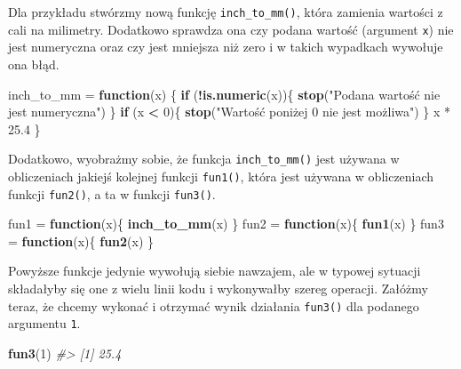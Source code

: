 \documentclass[paper=6in:9in,pagesize=pdftex,headinclude=on,footinclude=on,10pt]{scrbook}
\newenvironment{Shaded}{\begin{snugshade}}{\end{snugshade}}
\newcommand{\CommentTok}[1]{\textcolor[rgb]{0.56,0.35,0.01}{\textit{#1}}}
\newcommand{\ControlFlowTok}[1]{\textcolor[rgb]{0.13,0.29,0.53}{\textbf{#1}}}
\newcommand{\DecValTok}[1]{\textcolor[rgb]{0.00,0.00,0.81}{#1}}
\newcommand{\KeywordTok}[1]{\textcolor[rgb]{0.13,0.29,0.53}{\textbf{#1}}}
\newcommand{\NormalTok}[1]{#1}
\newcommand{\OperatorTok}[1]{\textcolor[rgb]{0.81,0.36,0.00}{\textbf{#1}}}
\newcommand{\StringTok}[1]{\textcolor[rgb]{0.31,0.60,0.02}{#1}}
\begin{document}
Dla przykładu stwórzmy nową funkcję \texttt{inch\_to\_mm()}, która zamienia wartości z cali na milimetry.
Dodatkowo sprawdza ona czy podana wartość (argument \texttt{x}) nie jest numeryczna oraz czy jest mniejsza niż zero i w takich wypadkach wywołuje ona błąd.

\begin{Shaded}
\begin{Highlighting}[]
\NormalTok{inch_to_mm =}\StringTok{ }\ControlFlowTok{function}\NormalTok{(x) \{}
  \ControlFlowTok{if}\NormalTok{ (}\OperatorTok{!}\KeywordTok{is.numeric}\NormalTok{(x))\{}
    \KeywordTok{stop}\NormalTok{(}\StringTok{"Podana wartość nie jest numeryczna"}\NormalTok{)}
\NormalTok{  \}}
  \ControlFlowTok{if}\NormalTok{ (x }\OperatorTok{<}\StringTok{ }\DecValTok{0}\NormalTok{)\{}
    \KeywordTok{stop}\NormalTok{(}\StringTok{"Wartość poniżej 0 nie jest możliwa")}
\StringTok{  \}}
\StringTok{  x * 25.4}
\StringTok{\}}
\end{Highlighting}
\end{Shaded}

Dodatkowo, wyobrażmy sobie, że funkcja \texttt{inch\_to\_mm()} jest używana w obliczeniach jakiejś kolejnej funkcji \texttt{fun1()}, która jest używana w obliczeniach funkcji \texttt{fun2()}, a ta w funkcji \texttt{fun3()}.

\begin{Shaded}
\begin{Highlighting}[]
\NormalTok{fun1 =}\StringTok{ }\ControlFlowTok{function}\NormalTok{(x)\{}
  \KeywordTok{inch_to_mm}\NormalTok{(x)}
\NormalTok{\}}
\NormalTok{fun2 =}\StringTok{ }\ControlFlowTok{function}\NormalTok{(x)\{}
  \KeywordTok{fun1}\NormalTok{(x)}
\NormalTok{\}}
\NormalTok{fun3 =}\StringTok{ }\ControlFlowTok{function}\NormalTok{(x)\{}
  \KeywordTok{fun2}\NormalTok{(x)}
\NormalTok{\}}
\end{Highlighting}
\end{Shaded}

Powyższe funkcje jedynie wywołują siebie nawzajem, ale w typowej sytuacji składałyby się one z wielu linii kodu i wykonywałby szereg operacji.
Załóżmy teraz, że chcemy wykonać i otrzymać wynik działania \texttt{fun3()} dla podanego argumentu \texttt{1}.

\begin{Shaded}
\begin{Highlighting}[]
\KeywordTok{fun3}\NormalTok{(}\DecValTok{1}\NormalTok{)}
\CommentTok{#> [1] 25.4}
\end{Highlighting}
\end{Shaded}
\end{document}
